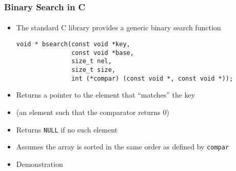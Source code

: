 \documentclass[]{beamer}
\begin{document}
\begin{frame}[fragile]
  \frametitle{Binary Search in C}
  \framesubtitle{}

\begin{itemize}[<+->]
  \item The standard C library provides a generic binary search function
\begin{verbatim}
void * bsearch(const void *key,
               const void *base,
               size_t nel,
               size_t size,
               int (*compar) (const void *, const void *));
\end{verbatim}
  \item Returns a pointer to the element that ``matches'' the key
  \item (an element such that the comparator returns 0)
  \item Returns \texttt{NULL} if no such element
  \item Assumes the array is sorted in the same order as defined by 
  \texttt{compar}
  \item Demonstration
\end{itemize}

\end{frame}
\end{document}
